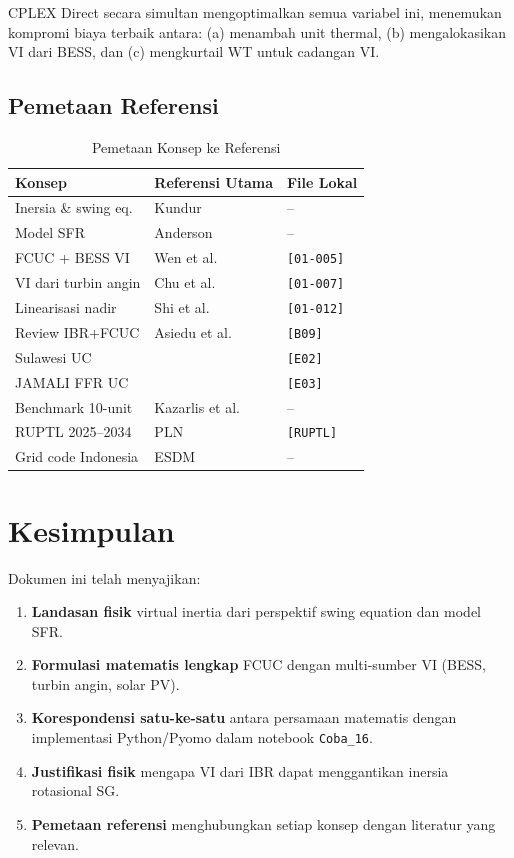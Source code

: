 \documentclass[journal]{IEEEtran}
\begin{document}
CPLEX Direct secara simultan mengoptimalkan semua variabel
ini, menemukan kompromi biaya terbaik antara: (a) menambah
unit thermal, (b) mengalokasikan VI dari BESS, dan
(c) mengkurtail WT untuk cadangan VI.

\subsection{Pemetaan Referensi}

\begin{table}[!t]\renewcommand{\arraystretch}{1.2}
\caption{Pemetaan Konsep ke Referensi}
\label{tab:refs}
\centering\footnotesize
\begin{tabular}{lll}
\toprule
Konsep & Referensi Utama & File Lokal \\
\midrule
Inersia \& swing eq. & Kundur~\cite{Kundur1994} & -- \\
Model SFR & Anderson~\cite{Anderson1990} & -- \\
FCUC + BESS VI & Wen et al.~\cite{Wen2016} & \texttt{[01-005]} \\
VI dari turbin angin & Chu et al.~\cite{Chu2020} & \texttt{[01-007]} \\
Linearisasi nadir & Shi et al.~\cite{Shi2025} & \texttt{[01-012]} \\
Review IBR+FCUC & Asiedu et al.~\cite{Asiedu2025} & \texttt{[B09]} \\
Sulawesi UC & \cite{Sulawesi2024} & \texttt{[E02]} \\
JAMALI FFR UC & \cite{JAMALI2025} & \texttt{[E03]} \\
Benchmark 10-unit & Kazarlis et al.~\cite{Kazarlis1996} & -- \\
RUPTL 2025--2034 & PLN~\cite{PLN2025} & \texttt{[RUPTL]} \\
Grid code Indonesia & ESDM~\cite{ESDM2007} & -- \\
\bottomrule
\end{tabular}
\end{table}

\section{Kesimpulan}
\label{sec:conclusion}

Dokumen ini telah menyajikan:
\begin{enumerate}
  \item \textbf{Landasan fisik} virtual inertia dari
    perspektif swing equation dan model SFR.
  \item \textbf{Formulasi matematis lengkap} FCUC dengan
    multi-sumber VI (BESS, turbin angin, solar PV).
  \item \textbf{Korespondensi satu-ke-satu} antara
    persamaan matematis dengan implementasi Python/Pyomo
    dalam notebook \texttt{Coba\_16}.
  \item \textbf{Justifikasi fisik} mengapa VI dari IBR
    dapat menggantikan inersia rotasional SG.
  \item \textbf{Pemetaan referensi} menghubungkan setiap
    konsep dengan literatur yang relevan.
\end{enumerate}
\end{document}
